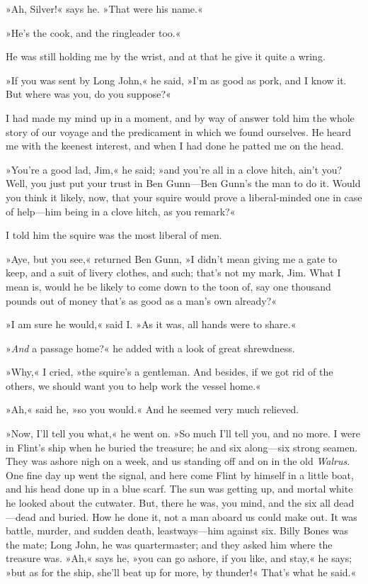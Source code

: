 »Ah, Silver!« says he. »That were his name.«

»He's the cook, and the ringleader too.«

He was still holding me by the wrist, and at that he give it quite a wring.

»If you was sent by Long John,« he said, »I'm as good as pork, and I know it. But where was you, do you suppose?«

I had made my mind up in a moment, and by way of answer told him the whole story of our voyage and the predicament in which we found ourselves. He heard me with the keenest interest, and when I had done he patted me on the head.

»You're a good lad, Jim,« he said; »and you're all in a clove hitch, ain't you? Well, you just put your trust in Ben Gunn—Ben Gunn's the man to do it. Would you think it likely, now, that your squire would prove a liberal-minded one in case of help—him being in a clove hitch, as you remark?«

I told him the squire was the most liberal of men.

»Aye, but you see,« returned Ben Gunn, »I didn't mean giving me a gate to keep, and a suit of livery clothes, and such; that's not my mark, Jim. What I mean is, would he be likely to come down to the toon of, say one thousand pounds out of money that's as good as a man's own already?«

»I am sure he would,« said I. »As it was, all hands were to share.«

»\textit{And} a passage home?« he added with a look of great shrewdness.

»Why,« I cried, »the squire's a gentleman. And besides, if we got rid of the others, we should want you to help work the vessel home.«

»Ah,« said he, »so you would.« And he seemed very much relieved.

»Now, I'll tell you what,« he went on. »So much I'll tell you, and no more. I were in Flint's ship when he buried the treasure; he and six along—six strong seamen. They was ashore nigh on a week, and us standing off and on in the old \textit{Walrus}. One fine day up went the signal, and here come Flint by himself in a little boat, and his head done up in a blue scarf. The sun was getting up, and mortal white he looked about the cutwater. But, there he was, you mind, and the six all dead—dead and buried. How he done it, not a man aboard us could make out. It was battle, murder, and sudden death, leastways—him against six. Billy Bones was the mate; Long John, he was quartermaster; and they asked him where the treasure was. »Ah,« says he, »you can go ashore, if you like, and stay,« he says; »but as for the ship, she'll beat up for more, by thunder!« That's what he said.«

